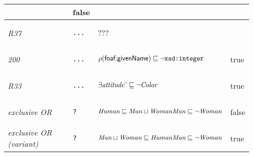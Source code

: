 \begin{table*}[htb]
\begin{tabular}{>{\centering\arraybackslash}p{25mm}!{\vrule width 0.5pt}>{\centering\arraybackslash}p{50mm}|>{\centering\arraybackslash}p{60mm}|>{\centering\arraybackslash}p{15mm}}
& false \\ \hline
\textit{R37}
& \begin{verbatim}...\end{verbatim}
& \flushleft $???$
&  \\ \hline
\textit{200}
& \begin{verbatim}...\end{verbatim}
& \flushleft $\rho(\textsf{foaf:givenName}) \sqsubseteq \neg\verb|xsd:integer|$
& true \\ \hline
\textit{R33}
& \begin{verbatim}...\end{verbatim}
& \flushleft $\exists \textit{attitude}\sp{\overline{\ }} \sqsubseteq \neg\textit{Color}$
& true \\ \midrule
\textit{exclusive OR}
& \begin{verbatim}?\end{verbatim}
& \flushleft $\textit{Human} \sqsubseteq \textit{Man} \sqcup \textit{Woman} \linebreak \textit{Man} \sqsubseteq \neg\textit{Woman}$
& false \\ \hline
\textit{exclusive OR \linebreak (variant)}
& \begin{verbatim}?\end{verbatim}
& \flushleft $\textit{Man} \sqcup \textit{Woman} \sqsubseteq \textit{Human} \linebreak \textit{Man} \sqsubseteq \neg\textit{Woman}$
& true \\ \bottomrule
\end{tabular}
\end{table*}